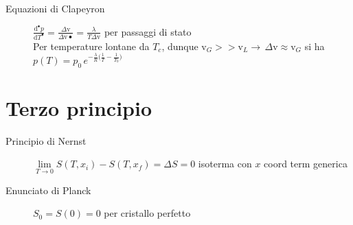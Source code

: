 \documentclass[10pt, oneside]{article}
\begin{document}
{}
\\~\\
\begin{description}
\item[Equazioni di Clapeyron] $\displaystyle \frac{\mathrm{d}^{•} p}{\mathrm{d}T^{•}} = \frac{\Delta \mathrm{v}}{\Delta \mathrm{v}•} = \frac{\lambda}{T \Delta \mathrm{v}}$ per passaggi di stato
\\Per temperature lontane da $T_c$, dunque $\mathrm{v}_G >> \mathrm{v}_L \rightarrow \, \Delta \mathrm{v} \approx \mathrm{v}_G$ si ha $\boxed{\displaystyle p(T) = p_0 \, e^{\displaystyle - \frac{\lambda}{R} \big( \frac{1}{T} - \frac{1}{T_0}\big)}}$
\end{description}
\section{Terzo principio}
\begin{description}
\item[Principio di Nernst] $\displaystyle \lim\limits_{T \rightarrow 0} S(T, x_i) - S(T, x_f) = \Delta S = 0$ isoterma con $x$ coord term generica
\item[Enunciato di Planck] $\displaystyle S_0 = S(0) = 0$ per cristallo perfetto
\end{description}
\end{document}

